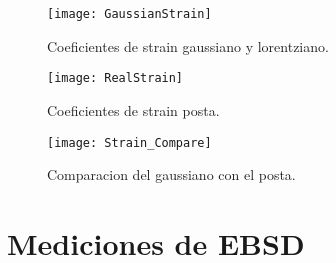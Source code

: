 \begin{figure}[!htb]
  \centering
  \texttt{[image: GaussianStrain]}
  \caption{Coeficientes de strain gaussiano y lorentziano.}
  \label{fig:GaussStrainn}
\end{figure}

\begin{figure}[!htb]
  \centering
  \texttt{[image: RealStrain]}
  \caption{Coeficientes de strain posta.}
  \label{fig:RealStrain}
\end{figure}

\begin{figure}[!htb]
  \centering
  \texttt{[image: Strain\_Compare]}
  \caption{Comparacion del gaussiano con el posta.}
  \label{fig:RealvsGauss}
\end{figure}

\newpage
\section{Mediciones de EBSD}\label{S:MatEBSD}
